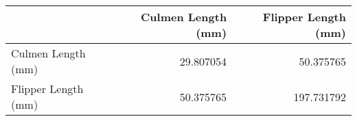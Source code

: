 \begin{tabular}{lrr}
\toprule
{} &  Culmen Length (mm) &  Flipper Length (mm) \\
\midrule
Culmen Length (mm)  &           29.807054 &            50.375765 \\
Flipper Length (mm) &           50.375765 &           197.731792 \\
\bottomrule
\end{tabular}
